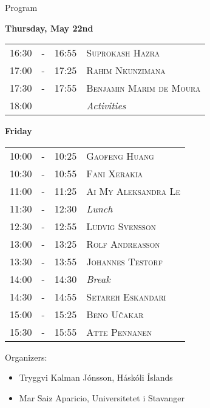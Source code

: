 \documentclass[12pt, openany, twoside]{report}      %
\begin{document}
\renewcommand{\arraystretch}{1.2}

\noindent
{\LARGE Program}

\bigskip
\bigskip
\noindent
\textbf{\large Thursday, May 22nd}
\smallskip

\noindent
\begin{tabular}{l@{ } l@{ } l l}
16:30 & - & 16:55 & \textsc{Suprokash Hazra}
\\
17:00 & - & 17:25 & \textsc{Rahim Nkunzimana}
\\
17:30 & - & 17:55 & \textsc{Benjamin Marim de Moura}
\\
18:00 &  &  & \textit{Activities}
\end{tabular}

\bigskip
\noindent
\textbf{\large Friday}
\smallskip

\noindent
\begin{tabular}{l@{ } l@{ } l l}
10:00 & - & 10:25 & \textsc{Gaofeng Huang}
\\
10:30 & - & 10:55 & \textsc{Fani Xerakia}
\\
11:00 & - & 11:25 & \textsc{Ai My Aleksandra Le}
\\
11:30 & - & 12:30 & \textit{Lunch}
\\
12:30 & - & 12:55 & \textsc{Ludvig Svensson}
\\
13:00 & - & 13:25 & \textsc{Rolf Andreasson}
\\
13:30 & - & 13:55 & \textsc{Johannes Testorf}
\\
14:00 & - & 14:30 & \textit{Break}
\\
14:30 & - & 14:55 & \textsc{Setareh Eskandari}
\\
15:00 & - & 15:25 & \textsc{Beno Učakar}
\\
15:30 & - & 15:55 & \textsc{Atte Pennanen}
\end{tabular}




\vfill
\vfill
\noindent
Organizers:
\begin{itemize}
    \setlength\itemsep{-0.3 em}
    \item Tryggvi Kalman Jónsson, Háskóli Íslands
    \item Mar Saiz Aparicio, Universitetet i Stavanger
\end{itemize}
\vfill

\cleardoublepage

\newcommand\talk[3]{%
    \vspace{3 ex}
    \noindent
    \textsc{\large #1}

    \smallskip
    \noindent
    \textbf{\textit{#2}}

    \medskip
    \noindent
    #3

}
\end{document}

